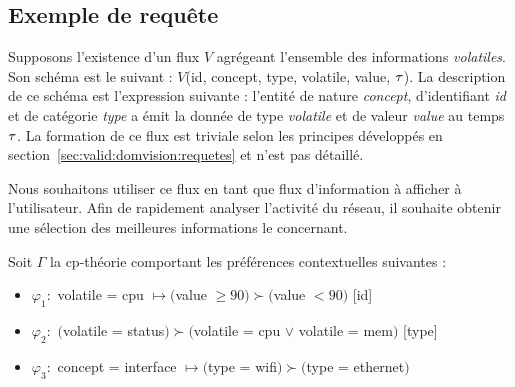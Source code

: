 \subsection{Exemple de requête}
Supposons l'existence d'un flux $V$ agrégeant l'ensemble des informations \textit{volatiles}. Son schéma est le suivant : $V$(id, concept, type, volatile, value, $\tau$). La description de ce schéma est l'expression suivante : l'entité de nature \textit{concept}, d'identifiant \textit{id} et de catégorie \textit{type} a émit la donnée de type \textit{volatile} et de valeur \textit{value} au temps $\tau$. La formation de ce flux est triviale selon les principes développés en section~\ref{sec:valid:domvision:requetes} et n'est pas détaillé.

Nous souhaitons utiliser ce flux en tant que flux d'information à afficher à l'utilisateur. Afin de rapidement analyser l'activité du réseau, il souhaite obtenir une sélection des meilleures informations le concernant.

Soit $\Gamma$ la cp-théorie comportant les préférences contextuelles suivantes :
\begin{itemize}
	\item $\varphi_1 : $ volatile = cpu $\mapsto ($value $ \geq 90) \succ ($value $ < 90)$ [id]
	\item $\varphi_2 : $ $($volatile = status$) \succ ($volatile = cpu $ \vee $ volatile = mem$)$ [type]
	\item $\varphi_3 : $ concept = interface $\mapsto ($type = wifi$) \succ ($type = ethernet$)$
\end{itemize}


